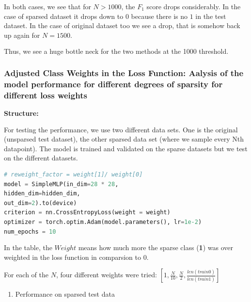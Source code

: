 \begin{solve}
\begin{enumerate}
    In both cases, we see that for $N>1000$, the $F_1$ score drops considerably. In the case of sparsed dataset it drops down to $0$ because there is no $1$ in the test dataset. In the case of original dataset too we see a drop, that is somehow back up again for $N=1500$. 

    Thus, we see a huge bottle neck for the two methods at the 1000 threshold.
\end{enumerate}



\subsubsection{Adjusted Class Weights in the Loss Function: Aalysis of the model performance for different degrees of sparsity for different loss weights}

\textbf{Structure:} 

For testing the performance, we use two different data sets. One is the original (unsparsed test dataset), the other sparsed data set (where we sample every Nth datapoint). The model is trained and validated on the sparse datasets but we test on the different datasets.

\begin{lstlisting}[language=python, title = Adjusting the weight in the loss function]
# reweight_factor = weight[1]/ weight[0] 
model = SimpleMLP(in_dim=28 * 28,
hidden_dim=hidden_dim,
out_dim=2).to(device)
criterion = nn.CrossEntropyLoss(weight = weight)
optimizer = torch.optim.Adam(model.parameters(), lr=1e-2)
num_epochs = 10
\end{lstlisting}

In the table, the $Weight$ means how much more the sparse class (\textbf{1}) was over weighted in the loss function in comparsion to $0$. 

For each of the $N$, four different weights were tried:
$\left[1, \frac{N}{10}, \frac{N}{2}, \frac{len(train 0)}{len(train 1)}\right]$

\begin{enumerate}
    \item {Performance on sparsed test data}
    

\end{enumerate}
\end{solve}
